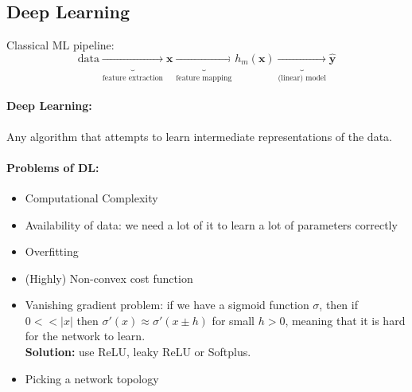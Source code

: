 \documentclass{article}
\renewcommand{\vec}[1]{\mathbf{#1}}
\renewcommand{\|}{\,\,|\,\,}
\begin{document}
\subsection{Deep Learning}
Classical ML pipeline:
\[
  \text{data} \underbrace{\to}_{\text{feature extraction}} \vec{x}
  \underbrace{\to}_{\text{feature mapping}} h_m(\vec{x})
  \underbrace{\to}_{\text{(linear) model}} \hat{\vec{y}}
\]
\paragraph{Deep Learning:} Any algorithm that attempts to learn intermediate
representations of the data.
\paragraph{Problems of DL:}
\begin{itemize}
\item Computational Complexity
\item Availability of data: we need a lot of it to learn a lot of parameters correctly
\item Overfitting
\item (Highly) Non-convex cost function
\item Vanishing gradient problem: 
  if we have a sigmoid function $\sigma$, then if $0 << |x|$ then $\sigma'(x)
  \approx \sigma'(x \pm h)$ for small $h > 0$, meaning that it is hard for the
  network to learn. \\
  \textbf{Solution:} use ReLU, leaky ReLU or Softplus. 
\item Picking a network topology
\end{itemize}
\end{document}
